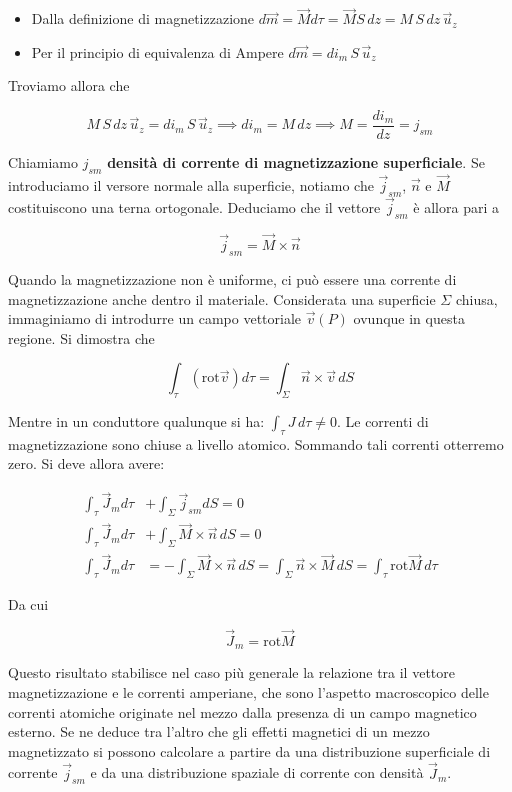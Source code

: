 \begin{itemize}
	\item Dalla definizione di magnetizzazione $ d\vec{m} =\vec{M} d\tau =\vec{M} S\,dz = M\,S\,dz\,\vec{u}_z $
	\item Per il principio di equivalenza di Ampere $ d\vec{m} = di_m\,S\,\vec{u}_z$
\end{itemize}

Troviamo allora che

\[
	M\,S\,dz\,\vec{u}_z=di_m\,S\,\vec{u}_z \implies di_m = M\,dz \implies  M=\frac{di_m}{dz}= j_{sm}
\]

Chiamiamo $ j_{sm}  $ \textbf{densità di corrente di magnetizzazione superficiale}. Se introduciamo il versore normale alla superficie, notiamo che $\vec{j}_{sm} $, $\vec{n}$ e $\vec{M}$ costituiscono una terna ortogonale. Deduciamo che il vettore $\vec{j}_{sm} $ è allora pari a

\[
	\boxed{\vec{j}_{sm} = \vec{M} \times \vec{n}}
\]

Quando la magnetizzazione non è uniforme, ci può essere una corrente di magnetizzazione anche dentro il materiale. Considerata una superficie $\Sigma$ chiusa, immaginiamo di introdurre un campo vettoriale $\vec{v}(P)$ ovunque in questa regione. Si dimostra che

\[
	\int_{\tau}(\text{rot}\vec{v} )d\tau = \int_{\Sigma} \vec{n} \times \vec{v} \,dS
\]

Mentre in un conduttore qualunque si ha: $ \int_{\tau}J\,d\tau \neq 0  $.
Le correnti di magnetizzazione sono chiuse a livello atomico. Sommando tali correnti otterremo zero. Si deve allora avere:

\begin{align*}
	\int_{\tau}\vec{J}_md\tau &+\int_{\Sigma}\vec{j}_{sm}dS = 0 \\
	\int_{\tau}\vec{J}_md\tau &+\int_{\Sigma}\vec{M} \times \vec{n} \,dS = 0 \\
	\int_{\tau}\vec{J}_md\tau &= - \int_{\Sigma}\vec{M} \times \vec{n} \,dS = \int_{\Sigma}\vec{n} \times \vec{M} \,dS = \int_{\tau}\text{rot}\vec{M} \,d\tau
\end{align*}

Da cui

\[
	\boxed{\vec{J}_m = \text{rot}\vec{M}}
\]

Questo risultato stabilisce nel caso più generale la relazione tra il
vettore magnetizzazione e le correnti amperiane, che sono l'aspetto macroscopico delle correnti atomiche originate nel mezzo dalla presenza di un campo magnetico esterno. Se ne deduce tra l'altro che gli effetti magnetici di un mezzo magnetizzato si possono calcolare a partire da una distribuzione superficiale di corrente $\vec{j}_{sm}$ e da una distribuzione spaziale di corrente con densità $\vec{J}_m$.


